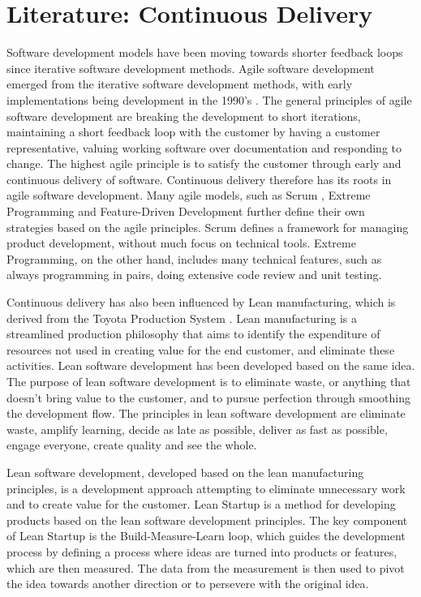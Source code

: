 \documentclass[english, grading]{tktltiki2}
\theoremstyle{definition}
\theoremstyle{remark}
\begin{document}
\section{Literature: Continuous Delivery}
Software development models have been moving towards shorter feedback loops since iterative software development methods. Agile software development emerged from the iterative software development methods, with early implementations being development in the 1990's \cite{dybaa2008empirical}. The general principles of agile software development are breaking the development to short iterations, maintaining a short feedback loop with the customer by having a customer representative, valuing working software over documentation and responding to change. The highest agile principle is to satisfy the customer through early and continuous delivery of software. Continuous delivery therefore has its roots in agile software development. Many agile models, such as Scrum \cite{schwaber2002gile}, Extreme Programming \cite{beck2000extreme} and Feature-Driven Development \cite{palmer2001practical} further define their own strategies based on the agile principles. Scrum defines a framework for managing product development, without much focus on technical tools. Extreme Programming, on the other hand, includes many technical features, such as always programming in pairs, doing extensive code review and unit testing.

Continuous delivery has also been influenced by Lean manufacturing, which is derived from the Toyota Production System \cite{ono1988toyota}. Lean manufacturing is a streamlined production philosophy that aims to identify the expenditure of resources not used in creating value for the end customer, and eliminate these activities. Lean software development \cite{poppendieck2003lean} has been developed based on the same idea. The purpose of lean software development is to eliminate waste, or anything that doesn't bring value to the customer, and to pursue perfection through smoothing the development flow. The principles in lean software development are eliminate waste, amplify learning, decide as late as possible, deliver as fast as possible, engage everyone, create quality and see the whole. 

Lean software development, developed based on the lean manufacturing principles, is a development approach attempting to eliminate unnecessary work and to create value for the customer. Lean Startup \cite{ries2011lean} is a method for developing products based on the lean software development principles. The key component of Lean Startup is the Build-Measure-Learn loop, which guides the development process by defining a process where ideas are turned into products or features, which are then measured. The data from the measurement is then used to pivot the idea towards another direction or to persevere with the original idea.
\end{document}
